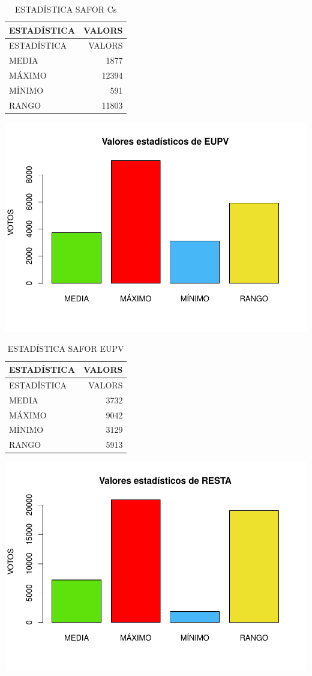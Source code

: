 \documentclass[
]{article}
\begin{document}
\begin{longtable}[]{@{}lr@{}}
\caption{ESTADÍSTICA SAFOR Cs}\tabularnewline
\toprule\noalign{}
ESTADÍSTICA & VALORS \\
\midrule\noalign{}
\endfirsthead
\toprule\noalign{}
ESTADÍSTICA & VALORS \\
\midrule\noalign{}
\endhead
\bottomrule\noalign{}
\endlastfoot
MEDIA & 1877 \\
MÁXIMO & 12394 \\
MÍNIMO & 591 \\
RANGO & 11803 \\
\end{longtable}

\includegraphics{SAFOR_files/figure-latex/6-7.pdf}

\begin{longtable}[]{@{}lr@{}}
\caption{ESTADÍSTICA SAFOR EUPV}\tabularnewline
\toprule\noalign{}
ESTADÍSTICA & VALORS \\
\midrule\noalign{}
\endfirsthead
\toprule\noalign{}
ESTADÍSTICA & VALORS \\
\midrule\noalign{}
\endhead
\bottomrule\noalign{}
\endlastfoot
MEDIA & 3732 \\
MÁXIMO & 9042 \\
MÍNIMO & 3129 \\
RANGO & 5913 \\
\end{longtable}

\includegraphics{SAFOR_files/figure-latex/6-8.pdf}
\end{document}
